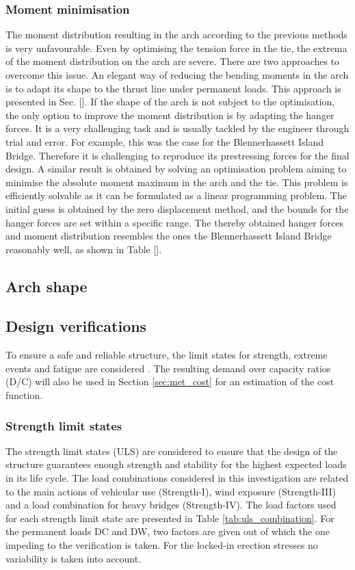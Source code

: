 \subsubsection{Moment minimisation}
The moment distribution resulting in the arch according to the previous methods is very unfavourable. Even by optimising the tension force in the tie, the extrema of the moment distribution on the arch are severe. There are two approaches to overcome this issue. An elegant way of reducing the bending moments in the arch is to adapt its shape to the thrust line under permanent loads. This approach is presented in Sec. []. If the shape of the arch is not subject to the optimisation, the only option to improve the moment distribution is by adapting the hanger forces. It is a very challenging task and is usually tackled by the engineer through trial and error. For example, this was the case for the Blennerhassett Island Bridge. Therefore it is challenging to reproduce its prestressing forces for the final design. A similar result is obtained by solving an optimisation problem aiming to minimise the absolute moment maximum in the arch and the tie. This problem is efficiently solvable as it can be formulated as a linear programming problem. The initial guess is obtained by the zero displacement method, and the bounds for the hanger forces are set within a specific range.  The thereby obtained hanger forces and moment distribution resembles the ones the Blennerhassett Island Bridge reasonably well, as shown in Table [].

\subsection{Arch shape}

\newpage
\subsection{Design verifications} \label{sec:met_ver}
To ensure a safe and reliable structure, the limit states for strength, extreme events and fatigue are considered \citep{AASHTO}.  The resulting demand over capacity ratios (D/C) will also be used in Section \ref{sec:met_cost} for an estimation of the cost function.

\subsubsection{Strength limit states}
The strength limit states (ULS) are considered to ensure that the design of the structure guarantees enough strength and stability for the highest expected loads in its life cycle. The load combinations considered in this investigation are related to the main actions of vehicular use (Strength-I), wind exposure (Strength-III) and a load combination for heavy bridges (Strength-IV). The load factors used for each strength limit state are presented in Table \ref{tab:uls_combination}. For the permanent loads DC and DW, two factors are given out of which the one impeding to the verification is taken. For the locked-in erection stresses no variability is taken into account.

